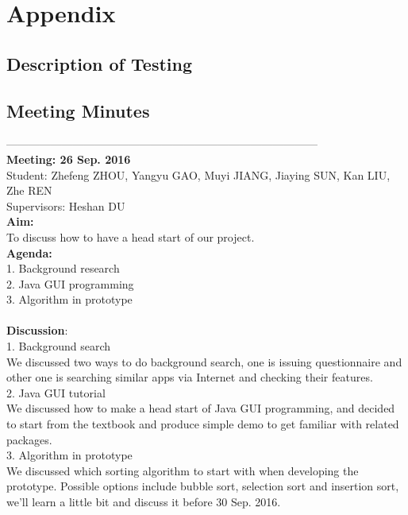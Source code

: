 \documentclass[paper=a4, fontsize=11pt,twoside]{scrartcl}		%
\begin{document}
\section{Appendix}

\subsection{Description of Testing}
\subsection{Meeting Minutes}
------------------------------------------------------------------------------------\\
\textbf{Meeting: 26 Sep. 2016}\\


Student: Zhefeng ZHOU, Yangyu GAO, Muyi JIANG, Jiaying SUN, Kan LIU, Zhe REN\\
Supervisors: Heshan DU\\

\textbf{Aim:} \\
To discuss how to have a head start of our project.\\

\textbf{Agenda:} \\
1.	Background research\\
2.	Java GUI programming\\
3.	Algorithm in prototype\\\\

\textbf{Discussion}:\\
1.	Background search\\

We discussed two ways to do background search, one is issuing questionnaire and other one is searching similar apps via Internet and checking their features.\\
 
2.	Java GUI tutorial\\

We discussed how to make a head start of Java GUI programming, and decided to start from the textbook and produce simple demo to get familiar with related packages.\\
   
3.	Algorithm in prototype\\

We discussed which sorting algorithm to start with when developing the prototype.  Possible options include bubble sort, selection sort and insertion sort, we’ll learn a little bit and discuss it before 30 Sep. 2016.\\\\
\end{document}
